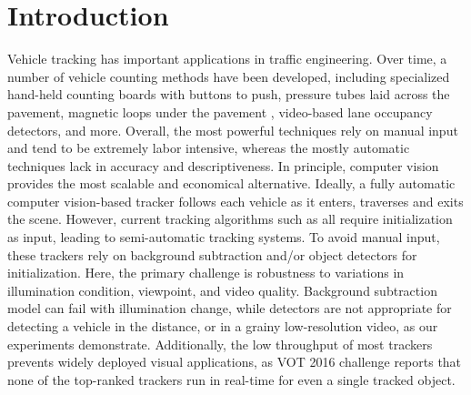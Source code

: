 \section{Introduction}
\label{sec:tracker-intro}

Vehicle tracking has important applications in traffic engineering.
Over time, a number of vehicle counting methods have been developed, including specialized hand-held counting boards with buttons to push, pressure tubes laid across the pavement, magnetic loops under the pavement \cite{klein2006traffic,mimbela2000summary},
video-based lane occupancy detectors, and more. 
Overall, the most powerful techniques rely on manual input and tend to be extremely labor intensive, whereas the mostly automatic techniques lack in accuracy and descriptiveness.
In principle, computer vision provides the most scalable and economical alternative. 
Ideally, a fully automatic computer vision-based tracker follows each vehicle as it enters, traverses and exits the scene.
However, current tracking algorithms such as \cite{henriques2015high,vojir2014robust,hare2011struck,possegger2015defense} all require initialization as input, leading to semi-automatic tracking systems. 
To avoid manual input, these trackers rely on background subtraction and/or object detectors for initialization. 
Here, the primary challenge is robustness to variations in illumination condition, viewpoint, and video quality. 
Background subtraction model can fail with illumination change, while detectors are not appropriate for detecting a vehicle in the distance, or in a grainy low-resolution video, as our experiments demonstrate. 
Additionally, the low throughput of most trackers prevents widely deployed visual applications, as VOT 2016 challenge reports that none of the top-ranked trackers run in real-time for even a single tracked object.


